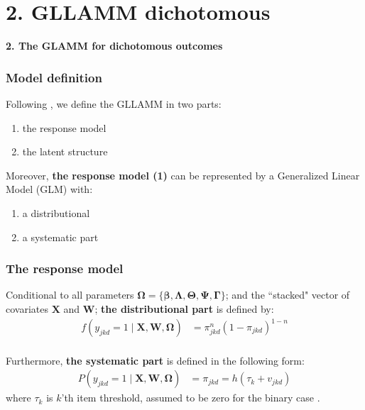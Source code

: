 \documentclass[arial,12pt,xcolor=dvipsnames]{beamer}
\begin{document}
\section{2. GLLAMM dichotomous}
%
\begin{frame}
	\textbf{2. The GLAMM for dichotomous outcomes}
\end{frame}
%
\begin{frame}
	\frametitle{Model definition}
	Following \citet{Rabe_et_al_2004a, Rabe_et_al_2004b}, we define the GLLAMM in two parts: 
	\begin{enumerate}
		\item the response model
		\item the latent structure
	\end{enumerate}
	\vspace{0.3cm} Moreover, \textbf{the response model (1)} can be represented by 
	a Generalized Linear Model (GLM) \cite{Nelder_et_al_1972, Nelder_et_al_1989} with:
	\begin{enumerate}
		\item a distributional
		\item a systematic part
	\end{enumerate}
\end{frame}
%
\begin{frame}
	\frametitle{The response model}
	Conditional to all parameters $\pmb{\Omega} = \{ \pmb{\beta}, \pmb{\Lambda}, \pmb{\Theta}, \pmb{\Psi}, \pmb{\Gamma} \}$; and the ``stacked" vector of covariates $\mathbf{X}$ and $\mathbf{W}$; \textbf{the distributional part} is defined by:
	\begin{equation} \label{eq:distributional}
		\begin{split}
			f \left( y_{jkd}=1 \; | \; \mathbf{X}, \mathbf{W}, \pmb{\Omega} \right) &= \pi_{jkd}^{n} (1 - \pi_{jkd})^{1-n}
		\end{split}
	\end{equation} \\
	\vspace{0.3cm} Furthermore, \textbf{the systematic part} is defined in the following form:
	\begin{equation} \label{eq:systematic}
		\begin{split}
			P\left( y_{jkd}=1 \; | \; \mathbf{X}, \mathbf{W}, \pmb{\Omega} \right) &= \pi_{jkd} = h( \tau_{k} + v_{jkd} )
		\end{split}	
	\end{equation}
	where $\tau_{k}$ is $k$'th item threshold, assumed to be zero for the binary case \cite{Rabe_et_al_2004a}.
\end{frame}
\end{document}
